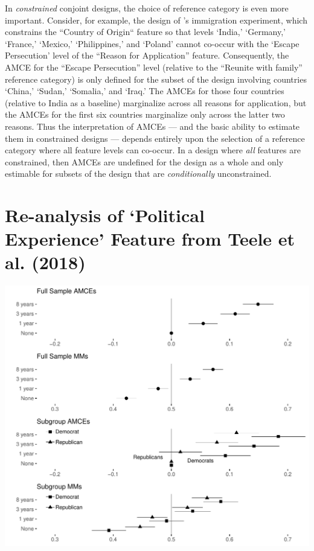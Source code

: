 \documentclass[a4paper,12pt]{article}\usepackage[]{graphicx}\usepackage[]{color}
\makeatletter
\def\maxwidth{ %
  \ifdim\Gin@nat@width>\linewidth
    \linewidth
  \else
    \Gin@nat@width
  \fi
}
\newenvironment{knitrout}{}{} %
\makeatother
\begin{document}
In \textit{constrained} conjoint designs, the choice of reference category is even more important. Consider, for example, the design of \citeauthor{HainmuellerHopkinsYamamoto2014}'s immigration experiment, which constrains the ``Country of Origin`` feature so that levels `India,' `Germany,' `France,' `Mexico,' `Philippines,' and `Poland' cannot co-occur with the `Escape Persecution' level of the ``Reason for Application'' feature. Consequently, the AMCE for the ``Escape Persecution'' level (relative to the  ``Reunite with family'' reference category) is only defined for the subset of the design involving countries `China,' `Sudan,' `Somalia,' and `Iraq.' The AMCEs for those four countries (relative to India as a baseline) marginalize across all reasons for application, but the AMCEs for the first six countries marginalize only across the latter two reasons. Thus the interpretation of AMCEs --- and the basic ability to estimate them in constrained designs --- depends entirely upon the selection of a reference category where all feature levels can co-occur. In a design where \textit{all} features are constrained, then AMCEs are undefined for the design as a whole and only estimable for subsets of the design that are \textit{conditionally} unconstrained.



\clearpage

\section{Re-analysis of `Political Experience' Feature from Teele et al. (2018)}\label{app:tkrpolexperience}

\begin{knitrout}
\color{fgcolor}
\includegraphics[width=\maxwidth]{figure/tkr_replication_experience-1} 

\end{knitrout}
\end{document}
